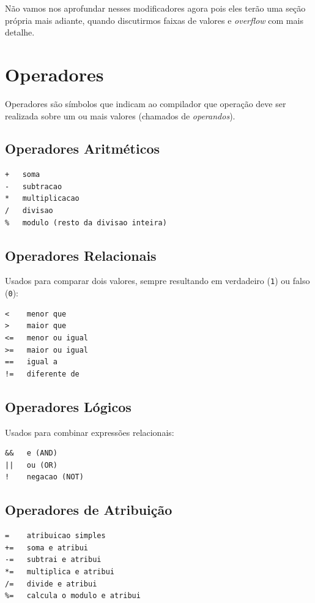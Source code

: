 \documentclass[12pt,a4paper,oneside]{extreport}
\begin{document}
Não vamos nos aprofundar nesses modificadores agora pois eles terão uma seção própria mais adiante, quando discutirmos faixas de valores e \textit{overflow} com mais detalhe.

\section{Operadores}
Operadores são símbolos que indicam ao compilador que operação deve ser realizada sobre um ou mais valores (chamados de \textit{operandos}).

\subsection{Operadores Aritméticos}
\begin{lstlisting}
+   soma
-   subtracao
*   multiplicacao
/   divisao
%   modulo (resto da divisao inteira)
\end{lstlisting}

\subsection{Operadores Relacionais}
Usados para comparar dois valores, sempre resultando em verdadeiro (\texttt{1}) ou falso (\texttt{0}):

\begin{lstlisting}
<    menor que
>    maior que
<=   menor ou igual
>=   maior ou igual
==   igual a
!=   diferente de
\end{lstlisting}

\subsection{Operadores Lógicos}
Usados para combinar expressões relacionais:

\begin{lstlisting}
&&   e (AND)
||   ou (OR)
!    negacao (NOT)
\end{lstlisting}

\subsection{Operadores de Atribuição}
\begin{lstlisting}
=    atribuicao simples
+=   soma e atribui
-=   subtrai e atribui
*=   multiplica e atribui
/=   divide e atribui
%=   calcula o modulo e atribui
\end{lstlisting}
\end{document}
